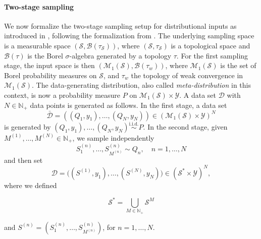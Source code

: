 \documentclass[letterpaper]{article} %
\newcommand{\Np}{\mathbb{N}_+}
\newcommand{\distr}{\sim}
\newcommand{\iiddistr}{\overset{\text{i.i.d.}}{\sim}}
\newcommand{\Borel}{\mathcal{B}} %
\newcommand{\samplingSet}{\mathcal{S}} %
\newcommand{\outputSet}{\mathcal{Y}} %
\newcommand{\dataSet}{\mathcal{D}}
\newcommand{\dataSetBar}{\bar{\dataSet}}
\newcommand{\distributions}{\mathcal{M}_1} %
\newcommand{\defm}[1]{\emph{#1}}
\newif\ifNotMuchSpace
\begin{document}
\paragraph{Two-stage sampling}
We now formalize the two-stage sampling setup for distributional inputs as introduced in \cite{poczos2013distribution,szabo2015two}, following the formalization from \cite{fiedler2024statistical}. %
The underlying sampling space is a measurable space $(\samplingSet, \Borel(\tau_\samplingSet))$, 
where $(\samplingSet,\tau_\samplingSet)$ is a topological space
and $\Borel(\tau)$ is the Borel $\sigma$-algebra generated by a topology $\tau$.
For the first sampling stage, the input space is then $(\distributions(\samplingSet),\Borel(\tau_w))$, 
where $\distributions(\samplingSet)$ is the set of Borel probability measures on $\samplingSet$, 
and $\tau_w$ the topology of weak convergence in $\distributions(\samplingSet)$.
The data-generating distribution, also called \defm{meta-distribution} in this context, is now a probability measure $P$ on $\distributions(\samplingSet)\times\outputSet$.
A data set $\dataSet$ with $N\in\Np$ data points is generated as follows.
In the first stage, a data set
\begin{equation} \label{eq:distrslt:dataSetBar}
    \dataSetBar=((Q_1,y_1),\ldots,(Q_N,y_N)) \in (\distributions(\samplingSet)\times\outputSet)^N
\end{equation}
is generated by $(Q_1,y_1),\ldots,(Q_N,y_N) \iiddistr P$.
In the second stage, given $M^{(1)},\ldots,M^{(N)}\in\Np$, we sample independently
\begin{equation*}
    S^{(n)}_1,\ldots,S^{(n)}_{M^{(n)}} \distr Q_n, \quad n=1,\ldots,N
\end{equation*}
and then set
\begin{equation} \label{eq:distrslt:dataSet}
    \dataSet = \big((S^{(1)},y_1),\ldots,(S^{(N)},y_N)\big) \in (\samplingSet^\ast\times\outputSet)^N,
\end{equation}
where we defined 
\ifNotMuchSpace
$ \samplingSet^\ast = \bigcup_{M\in\Np} \samplingSet^M$
\else
\begin{equation*}
    \samplingSet^\ast = \bigcup_{M\in\Np} \samplingSet^M
\end{equation*}
\fi
and $S^{(n)}=\left(S^{(n)}_1,\ldots,S^{(n)}_{M^{(n)}}\right)$, for $n=1,\ldots,N$.
\end{document}
